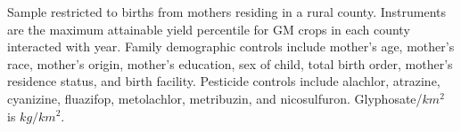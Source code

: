 \begin{table}[htbp]
\begin{threeparttable}[b]
      \begin{tablenotes}\item Sample restricted to births from mothers residing in a rural county. Instruments are the maximum attainable yield percentile for GM crops in each county interacted with year. Family demographic controls include mother's age, mother's race, mother's origin, mother's education, sex of child, total birth order, mother's residence status, and birth facility. Pesticide controls include alachlor, atrazine, cyanizine, fluazifop, metolachlor, metribuzin, and nicosulfuron. Glyphosate/$km^2$ is $kg/km^2$.
      \end{tablenotes}
   \end{threeparttable}
\end{table}
